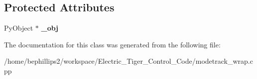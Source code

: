 \subsection*{Protected Attributes}
\begin{DoxyCompactItemize}
\item 
\hypertarget{classswig_1_1_swig_ptr___py_object_ae617c5726496db423cd19688e3264618}{Py\-Object $\ast$ {\bfseries \-\_\-obj}}\label{classswig_1_1_swig_ptr___py_object_ae617c5726496db423cd19688e3264618}

\end{DoxyCompactItemize}


The documentation for this class was generated from the following file\-:\begin{DoxyCompactItemize}
\item 
/home/bephillips2/workspace/\-Electric\-\_\-\-Tiger\-\_\-\-Control\-\_\-\-Code/modetrack\-\_\-wrap.\-cpp\end{DoxyCompactItemize}
